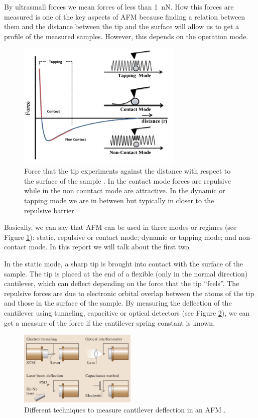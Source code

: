 \documentclass[11pt,a4paper]{article}
\begin{document}
By ultrasmall forces we mean forces of less than \SI{1}{\nano\N}. How this forces are measured is one of the key aspects of AFM because finding a relation between them and the distance between the tip and the surface will allow us to get a profile of the measured samples. However, this depends on the operation mode.

\begin{figure}[ht]
\centering
\includegraphics[width=0.7\textwidth]{AFM_modes}
\caption{Force that the tip experiments against the distance with respect to the surface of the sample \cite{jfb8010007}. In the contact mode forces are repulsive while in the non conntact mode are attractive. In the dynamic or tapping mode we are in between but typically in closer to the repulsive barrier.}
\label{fig:AFM_modes}
\end{figure}

{\color{red}Basically, we can say that AFM can be used in three modes or regimes} (see Figure \ref{fig:AFM_modes}): static, repulsive or contact mode; dynamic or tapping mode; and non-contact mode. In this report we will talk about the first two.

In the static mode, a sharp tip is brought into contact with the surface of the sample. The tip is placed at the end of a flexible (only in the normal direction) cantilever, which can deflect depending on the force that the tip ``feels''. The repulsive forces are due to electronic orbital overlap between the atoms of the tip and those in the surface of the sample. By measuring the deflection of the cantilever using tunneling, capacitive or optical detectors (see Figure \ref{fig:Deflection_measurement}), we can get a measure of the force if the cantilever spring constant is known.

\begin{figure}[ht]
\centering
\includegraphics[width=0.5\textwidth]{Deflection}
\caption{Different techniques to measure cantilever deflection in an AFM \cite{Bhushan}.}
\label{fig:Deflection_measurement}
\end{figure}
\end{document}
